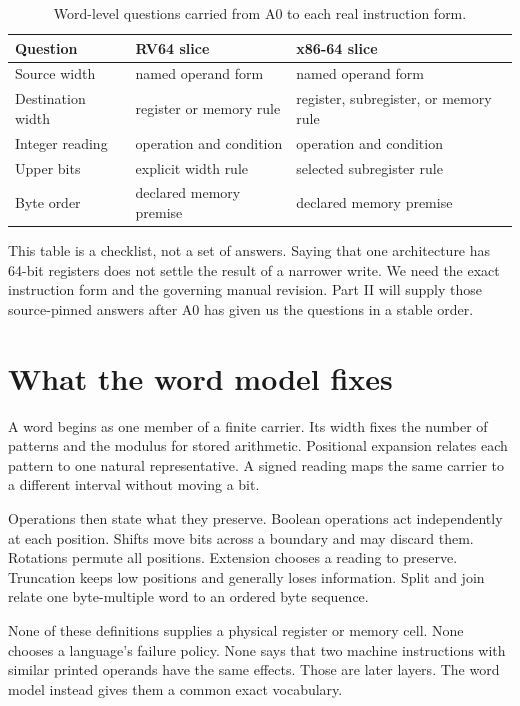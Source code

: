 \begin{table}
\centering
\caption{Word-level questions carried from A0 to each real instruction form.}
\begin{tabular}{p{}p{}p{}}
\toprule
Question & RV64 slice & x86-64 slice \\
\midrule
Source width & named operand form & named operand form \\
Destination width & register or memory rule & register, subregister, or memory rule \\
Integer reading & operation and condition & operation and condition \\
Upper bits & explicit width rule & selected subregister rule \\
Byte order & declared memory premise & declared memory premise \\
\bottomrule
\end{tabular}
\end{table}

This table is a checklist, not a set of answers. Saying that one architecture
has 64-bit registers does not settle the result of a narrower write. We need
the exact instruction form and the governing manual revision. Part II will
supply those source-pinned answers after A0 has given us the questions in a
stable order.

\section{What the word model fixes}

A word begins as one member of a finite carrier. Its width fixes the number of
patterns and the modulus for stored arithmetic. Positional expansion relates
each pattern to one natural representative. A signed reading maps the same
carrier to a different interval without moving a bit.

Operations then state what they preserve. Boolean operations act independently
at each position. Shifts move bits across a boundary and may discard them.
Rotations permute all positions. Extension chooses a reading to preserve.
Truncation keeps low positions and generally loses information. Split and join
relate one byte-multiple word to an ordered byte sequence.

None of these definitions supplies a physical register or memory cell. None
chooses a language's failure policy. None says that two machine instructions
with similar printed operands have the same effects. Those are later layers.
The word model instead gives them a common exact vocabulary.

